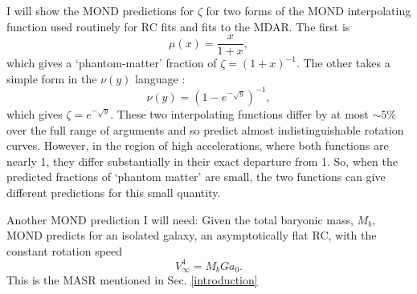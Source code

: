 \documentclass[twocolumn,showpacs,amsmath,amssymb,prd,nofootinbib]
{revtex4}
\def\sss{\scriptscriptstyle}
\def\_#1{_{\sss #1}}
\def\beq{\begin{equation}}
\def\eeqno#1{\label{#1}\end{equation}}
\def\az{a\_{0}}
\def\vinf{V_{\infty}}
\def\m{\mu}
\def\n{\nu}
\begin{document}
I will show the MOND predictions for $\zeta$ for two forms of the MOND interpolating function used routinely for RC fits and fits to the MDAR.
The first is
\beq \m(x)=\frac{x}{1+x}, \eeqno{i}
which gives a `phantom-matter' fraction of $\zeta=(1+x)^{-1}$.
The other takes a simple form in the $\n(y)$ language \cite{ms08,mcgaugh08,mls16,milgrom16}:
\beq \n(y)=(1-e^{-\sqrt{y}})^{-1},   \eeqno{ii}
which gives $\zeta=e^{-\sqrt{y}}$.
These two interpolating functions differ by at most $\sim 5\%$ over the full range of arguments and so predict almost indistinguishable rotation curves.
However, in the region of high accelerations, where both functions are nearly 1, they differ substantially in their exact departure from 1. So, when the predicted
fractions of `phantom matter' are small, the two functions can give different predictions for this small quantity.
\par
Another MOND prediction I will need: Given the total baryonic mass, $M_b$, MOND predicts \cite{milgrom83a,milgrom83b} for an isolated galaxy, an asymptotically flat RC, with the constant rotation speed
\beq \vinf^4=M_bG\az.  \eeqno{iii}
This is the MASR mentioned in Sec. \ref{introduction}
\end{document}
